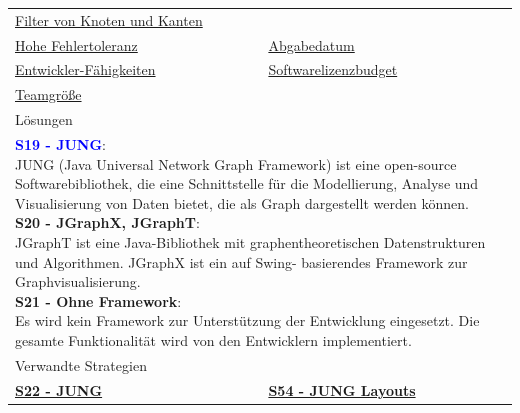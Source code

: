 \documentclass[enabledeprecatedfontcommands,fontsize=11pt,paper=a4,twoside]{scrartcl}
\newcounter{one}
\newcounter{two}[one]
\newcommand{\cb}[1]{{\textcolor{blue}{#1}}}
\begin{document}
\begin{tabular} {|p{8cm} p{8cm}|}
		\hyperlink {ss}{Filter von Knoten und Kanten} \\
		\hyperlink {tt}{Hohe Fehlertoleranz} &
		\hyperlink {uu}{Abgabedatum} \\
		\hyperlink {vv}{Entwickler-Fähigkeiten} &
		\hyperlink {ww}{Softwarelizenzbudget} \\
		\hyperlink {xx}{Teamgröße} &
		\\ \hline
		\multicolumn{2}{|l|}{Lösungen} \\
		\multicolumn{2}{|l|}{\parbox{16cm}{
				\textbf{\cb{\hypertarget{eee}{S19 - JUNG}}}: \\
				JUNG (Java Universal Network Graph Framework) ist eine open-source Softwarebibliothek, die eine Schnittstelle für die Modellierung, Analyse und Visualisierung von Daten bietet, die als Graph dargestellt werden können. \\
				\textbf{S20 - JGraphX, JGraphT}: \\
				JGraphT ist eine Java-Bibliothek mit graphentheoretischen Datenstrukturen und Algorithmen. JGraphX ist ein auf Swing- basierendes Framework zur Graphvisualisierung. \\
				\textbf{S21 - Ohne Framework}: \\
				Es wird kein Framework zur Unterstützung der Entwicklung eingesetzt. Die gesamte Funktionalität wird von den Entwicklern implementiert.
		} }\\ [11ex] \hline
		\multicolumn{2}{|l|}{Verwandte Strategien} \\
		\textbf{\hyperlink{fff}{S22 - JUNG}}&
		\textbf{\hyperlink{xee}{S54 - JUNG Layouts}}
		\\\hline
	\end{tabular}\\ \\ \\
\end{document}
